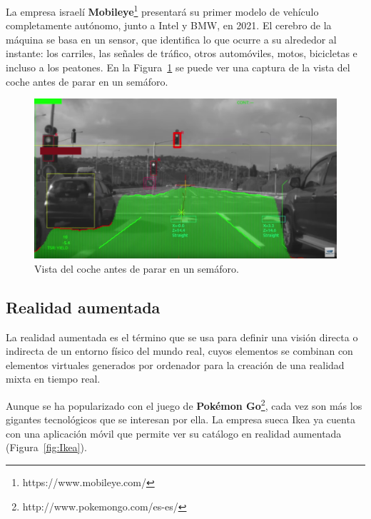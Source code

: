 La empresa israelí \textbf{Mobileye}\footnote{https://www.mobileye.com/} presentará su primer modelo de vehículo completamente autónomo, junto a Intel y BMW, en 2021. El cerebro de la máquina se basa en un sensor, que identifica lo que ocurre a su alrededor al instante: los carriles, las señales de tráfico, otros automóviles, motos, bicicletas e incluso a los peatones. En la Figura~\ref{fig:Car} se puede ver una captura de la vista del coche antes de parar en un semáforo.

\begin{figure}[th]
\centering
\includegraphics[scale=0.3]{Figures/car.png}
\decoRule
\caption[Visión para la autoconducción]{Vista del coche antes de parar en un semáforo.}
\label{fig:Car}
\end{figure}

\subsection{Realidad aumentada}

La realidad aumentada es el término que se usa para definir una visión directa o indirecta de un entorno físico del mundo real, cuyos elementos se combinan con elementos virtuales generados por ordenador para la creación de una realidad mixta en tiempo real.

Aunque se ha popularizado con el juego de \textbf{Pokémon Go}\footnote{http://www.pokemongo.com/es-es/}, cada vez son más los gigantes tecnológicos que se interesan por ella. La empresa sueca Ikea ya cuenta con una aplicación móvil que permite ver su catálogo en realidad aumentada (Figura~\ref{fig:Ikea}).

